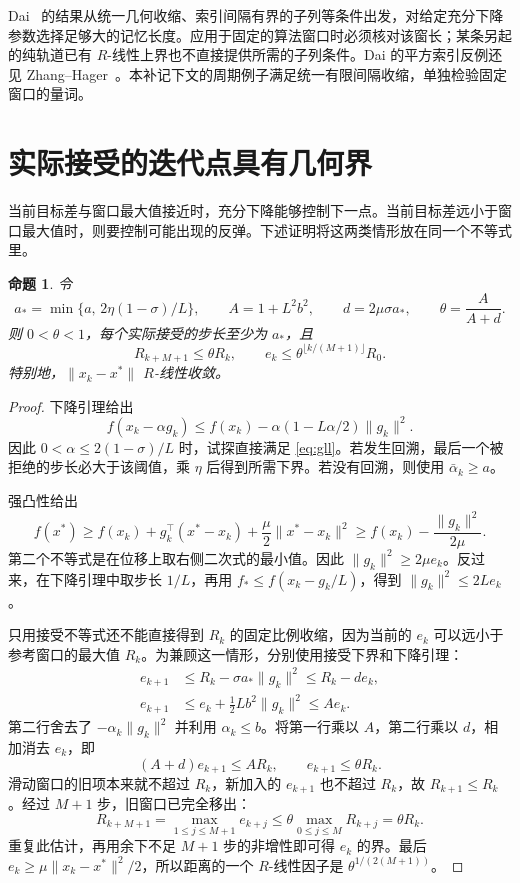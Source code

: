 \documentclass[11pt,a4paper,UTF8,fontset=fandol]{ctexart}
\newtheorem{proposition}{命题}
\begin{document}
Dai~\cite[Theorem~3.2, pp.~324--325]{dai} 的结果从统一几何收缩、索引间隔有界的子列等条件出发，对给定充分下降参数选择足够大的记忆长度。应用于固定的算法窗口时必须核对该窗长；某条另起的纯轨道已有 \(R\)-线性上界也不直接提供所需的子列条件。Dai 的平方索引反例还见 Zhang--Hager~\cite[p.~1044, Eq.~(1.3)]{zh}。本补记下文的周期例子满足统一有限间隔收缩，单独检验固定窗口的量词。

\section{实际接受的迭代点具有几何界}
当前目标差与窗口最大值接近时，充分下降能够控制下一点。当前目标差远小于窗口最大值时，则要控制可能出现的反弹。下述证明将这两类情形放在同一个不等式里。

\begin{proposition}\label{prop:window}
令
\[
 a_* =\min\{a,\,2\eta(1-\sigma)/L\},\qquad
 A=1+L^2b^2,\qquad d=2\mu\sigma a_*,\qquad
 \theta=\frac{A}{A+d}.
\]
则 \(0<\theta<1\)，每个实际接受的步长至少为 \(a_*\)，且
\[
 R_{k+M+1}\le\theta R_k,\qquad
 e_k\le \theta^{\lfloor k/(M+1)\rfloor}R_0 .
\]
特别地，\(\|x_k-x^*\|\) \(R\)-线性收敛。
\end{proposition}

\begin{proof}
下降引理给出
\[
 f(x_k-\alpha g_k)\le f(x_k)-\alpha(1-L\alpha/2)\|g_k\|^2 .
\]
因此 \(0<\alpha\le2(1-\sigma)/L\) 时，试探直接满足 \eqref{eq:gll}。若发生回溯，最后一个被拒绝的步长必大于该阈值，乘 \(\eta\) 后得到所需下界。若没有回溯，则使用 \(\bar\alpha_k\ge a\)。

强凸性给出
\[
 f(x^*)\ge f(x_k)+g_k^\top(x^*-x_k)+\frac{\mu}{2}\|x^*-x_k\|^2
           \ge f(x_k)-\frac{\|g_k\|^2}{2\mu}.
\]
第二个不等式是在位移上取右侧二次式的最小值。因此 \(\|g_k\|^2\ge2\mu e_k\)。反过来，在下降引理中取步长 \(1/L\)，再用 \(f_*\le f(x_k-g_k/L)\)，得到 \(\|g_k\|^2\le2Le_k\)。

只用接受不等式还不能直接得到 \(R_k\) 的固定比例收缩，因为当前的 \(e_k\) 可以远小于参考窗口的最大值 \(R_k\)。为兼顾这一情形，分别使用接受下界和下降引理：
\begin{align*}
 e_{k+1}&\le R_k-\sigma a_*\|g_k\|^2 \le R_k-de_k,\\
 e_{k+1}&\le e_k+\tfrac12Lb^2\|g_k\|^2 \le Ae_k .
\end{align*}
第二行舍去了 \(-\alpha_k\|g_k\|^2\) 并利用 \(\alpha_k\le b\)。将第一行乘以 \(A\)，第二行乘以 \(d\)，相加消去 \(e_k\)，即
\[
 (A+d)e_{k+1}\le AR_k,\qquad e_{k+1}\le\theta R_k.
\]
滑动窗口的旧项本来就不超过 \(R_k\)，新加入的 \(e_{k+1}\) 也不超过 \(R_k\)，故 \(R_{k+1}\le R_k\)。经过 \(M+1\) 步，旧窗口已完全移出：
\[
 R_{k+M+1}=\max_{1\le j\le M+1}e_{k+j}
          \le\theta\max_{0\le j\le M}R_{k+j}=\theta R_k .
\]
重复此估计，再用余下不足 \(M+1\) 步的非增性即可得 \(e_k\) 的界。最后 \(e_k\ge\mu\|x_k-x^*\|^2/2\)，所以距离的一个 \(R\)-线性因子是 \(\theta^{1/(2(M+1))}\)。
\end{proof}
\end{document}
